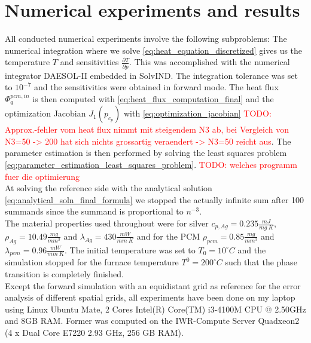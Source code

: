 \documentclass{scrartcl}[12pt, halfparskip]
\numberwithin{equation}{section}
\numberwithin{figure}{section}
\numberwithin{table}{section}
\newcommand{\todo}[1]{\textcolor{red}{TODO: #1}}
\begin{document}
\section{Numerical experiments and results}
All conducted numerical experiments involve the following subproblems: The numerical integration where we solve \eqref{eq:heat_equation_discretized} gives us the temperature $T$ and sensitivities $\frac{\partial T}{\partial p}$. This was accomplished with the numerical integrator DAESOL-II embedded in SolvIND. The integration tolerance was set to $10^{-7}$ and the sensitivities were obtained in forward mode.
The heat flux $\varPhi_q^{pcm,in}$ is then computed with \eqref{eq:heat_flux_computation_final} and the optimization Jacobian $J_1(p_{c_p})$ with \eqref{eq:optimization_jacobian} \todo{Approx.-fehler vom heat flux nimmt mit steigendem N3 ab, bei Vergleich von N3=50 -> 200 hat sich nichts grossartig veraendert -> N3=50 reicht aus}. The parameter estimation is then performed by solving the least squares problem \eqref{eq:parameter_estimation_least_squares_problem}. \todo{welches programm fuer die optimierung} \\
At solving the reference side with the analytical solution \eqref{eq:analytical_soln_final_formula} we stopped the actually infinite sum after 100 summands since the summand is proportional to $n^{-3}$. \\

The material properties used throughout were for silver $c_{p,Ag}=0.235 \frac{mJ}{mg \ K}$, $\rho_{Ag}=10.49 \frac{mg}{mm^3}$ and $\lambda_{Ag}=430 \frac{mW}{mm \ K}$ and for the PCM $\rho_{pcm}=0.85 \frac{mg}{mm^3}$ and $\lambda_{pcm}=0.96 \frac{mW}{mm \ K}$. The initial temperature was set to $T_0=10^\circ C$ and the simulation stopped for the furnace temperature $T^0=200^\circ C$ such that the phase transition is completely finished. \\

Except the forward simulation with an equidistant grid as reference for the error analysis of different spatial grids, all experiments have been done on my laptop using Linux Ubuntu Mate, 2 Cores Intel(R) Core(TM) i3-4100M CPU @ 2.50GHz and 8GB RAM. Former was computed on the IWR-Compute Server Quadxeon2 (4 x Dual Core E7220 2.93 GHz, 256 GB RAM).
\end{document}
